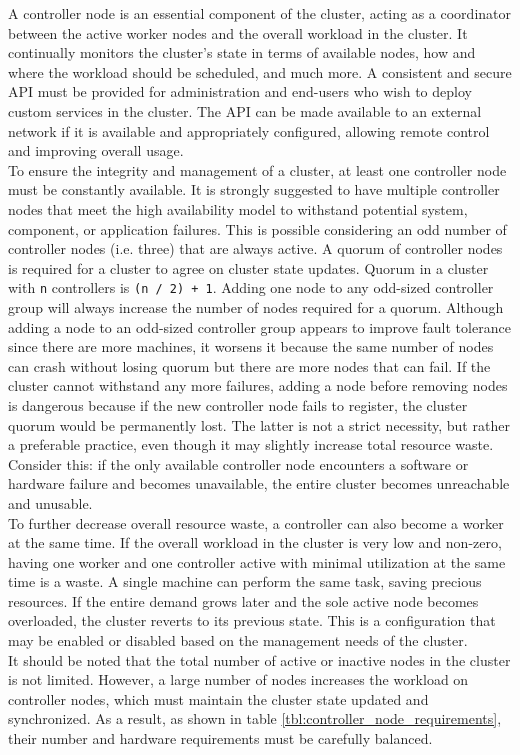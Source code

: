 A controller node is an essential component of the cluster, acting as a coordinator
between the active worker nodes and the overall workload in the cluster. It
continually monitors the cluster's state in terms of available nodes, how and where
the workload should be scheduled, and much more. A consistent and secure API must
be provided for administration and end-users who wish to deploy custom services in
the cluster. The API can be made available to an external network if it is
available and appropriately configured, allowing remote control and improving overall
usage. \\ %
To ensure the integrity and management of a cluster, at least one controller
node must be constantly available. It is strongly suggested to have multiple controller
nodes that meet the high availability model to withstand potential system,
component, or application failures. This is possible considering an odd number
of controller nodes (i.e. three) that are always active. A quorum of controller
nodes is required for a cluster to agree on cluster state updates. Quorum in a cluster
with \texttt{n} controllers is \texttt{(n / 2) + 1}. Adding one node to any odd-sized
controller group will always increase the number of nodes required for a quorum.
Although adding a node to an odd-sized controller group appears to improve fault
tolerance since there are more machines, it worsens it because the same number
of nodes can crash without losing quorum but there are more nodes that can fail.
If the cluster cannot withstand any more failures, adding a node before removing
nodes is dangerous because if the new controller node fails to register, the cluster
quorum would be permanently lost\cite{quorum}. The latter is not a strict necessity,
but rather a preferable practice, even though it may slightly increase total resource
waste. Consider this: if the only available controller node encounters a software
or hardware failure and becomes unavailable, the entire cluster becomes
unreachable and unusable.\\ %
To further decrease overall resource waste, a controller can also become a
worker at the same time. If the overall workload in the cluster is very low and non-zero,
having one worker and one controller active with minimal utilization at the same
time is a waste. A single machine can perform the same task, saving precious
resources. If the entire demand grows later and the sole active node becomes overloaded,
the cluster reverts to its previous state. This is a configuration that may be enabled
or disabled based on the management needs of the cluster. \\ %
It should be noted that the total number of active or inactive nodes in the cluster
is not limited. However, a large number of nodes increases the workload on controller
nodes, which must maintain the cluster state updated and synchronized. As a result,
as shown in table \ref{tbl:controller_node_requirements}\cite{k3s_requirements},
their number and hardware requirements must be carefully balanced.

